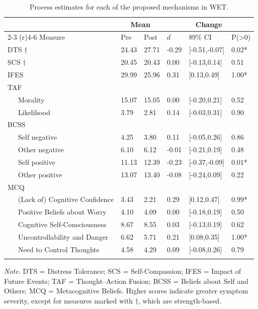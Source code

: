 \documentclass[
  man,floatsintext]{apa7}
\begin{document}
\begin{table}[tbp]

\begin{center}
\begin{threeparttable}

\caption{\label{tab:processes_tab}Process estimates for each of the proposed mechanisms in WET.}

\begin{tabular}{llllll}
\toprule
 & \multicolumn{2}{c}{Mean} & \multicolumn{3}{c}{Change} \\
\cmidrule(r){2-3} \cmidrule(r){4-6}
Measure & Pre & Post & $d$ & 89\% CI & P(>0)\\
\midrule
DTS † & 24.43 & 27.71 & -0.29 & {}[-0.51,-0.07] & 0.02*\\
SCS † & 20.45 & 20.43 & 0.00 & {}[-0.13,0.14] & 0.51\\
IFES & 29.99 & 25.96 & 0.31 & {}[0.13,0.49] & 1.00*\\
TAF &  &  &  &  & \\
\ \ \ Morality & 15.07 & 15.05 & 0.00 & {}[-0.20,0.21] & 0.52\\
\ \ \ Likelihood & 3.79 & 2.81 & 0.14 & {}[-0.03,0.31] & 0.90\\
BCSS &  &  &  &  & \\
\ \ \ Self negative & 4.25 & 3.80 & 0.11 & {}[-0.05,0.26] & 0.86\\
\ \ \ Other negative & 6.10 & 6.12 & -0.01 & {}[-0.21,0.19] & 0.48\\
\ \ \ Self positive & 11.13 & 12.39 & -0.23 & {}[-0.37,-0.09] & 0.01*\\
\ \ \ Other positive & 13.07 & 13.40 & -0.08 & {}[-0.24,0.09] & 0.22\\
MCQ &  &  &  &  & \\
\ \ \ (Lack of) Cognitive Confidence & 3.43 & 2.21 & 0.29 & {}[0.12,0.47] & 0.99*\\
\ \ \ Positive Beliefs about Worry & 4.10 & 4.09 & 0.00 & {}[-0.18,0.19] & 0.50\\
\ \ \ Cognitive Self-Consciousness & 8.67 & 8.55 & 0.03 & {}[-0.13,0.19] & 0.62\\
\ \ \ Uncontrollability and Danger & 6.62 & 5.71 & 0.21 & {}[0.08,0.35] & 1.00*\\
\ \ \ Need to Control Thoughts & 4.58 & 4.29 & 0.09 & {}[-0.08,0.26] & 0.79\\
\bottomrule
\addlinespace
\end{tabular}

\begin{tablenotes}[para]
\normalsize{\textit{Note.} DTS = Distress Tolerance; SCS = Self-Compassion; IFES = Impact of Future Events; TAF = Thought–Action Fusion; BCSS = Beliefs about Self and Others; MCQ = Metacognitive Beliefs. Higher scores indicate greater symptom severity, except for measures marked with †, which are strength-based.}
\end{tablenotes}

\end{threeparttable}
\end{center}

\end{table}
\end{document}
